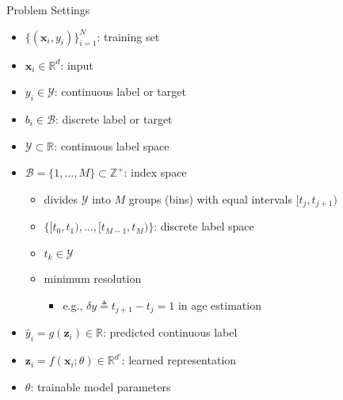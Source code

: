 \begin{frame}{Problem Settings}
	\begin{itemize}
		\item $\{(\mathbf{x}_i, y_i)\}_{i=1}^N$: training set
		\item $\mathbf{x}_i\in\mathbb{R}^{d}$: input
		\item $y_i\in\mathcal{Y}$: continuous label or target
		\item $b_i\in\mathcal{B}$: discrete label or target
		\item $\mathcal{Y}\subset\mathbb{R}$: continuous label space
		\item $\mathcal{B} = \{1,\dots,M\}\subset\mathbb{Z}^+$: index space
		\begin{itemize}
			\item divides $\mathcal{Y}$ into $M$ groups (bins) with equal intervals $[t_j, t_{j+1})$
			\item $\{[t_0, t_1), \dots, [t_{M-1}, t_M)\}$: discrete label space
			\item $t_k\in\mathcal{Y}$
			\item minimum resolution
			\begin{itemize}
				\item e.g., $\delta y \triangleq t_{j+1} - t_j = 1$ in age estimation
			\end{itemize}	
		\end{itemize}
		\item $\hat{y}_i = g(\mathbf{z}_i) \in \mathbb{R}$: predicted continuous label
		\item $\mathbf{z}_i = f(\mathbf{x}_i; \theta) \in \mathbb{R}^{d'}$: learned representation
		\item $\theta$: trainable model parameters
	\end{itemize}
\end{frame}